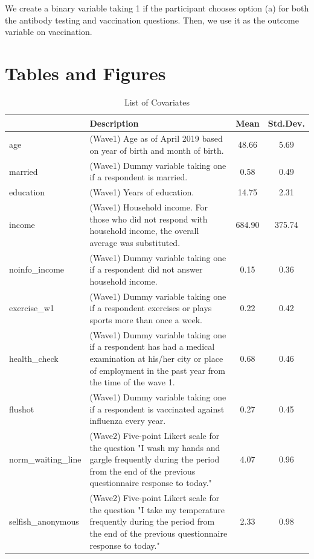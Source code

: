 \documentclass[
]{article}
\begin{document}
We create a binary variable taking 1 if the participant chooses option (a) for both the antibody testing and vaccination questions. Then, we use it as the outcome variable on vaccination.

\clearpage

\hypertarget{fig-tab}{%
\section{Tables and Figures}\label{fig-tab}}

\begin{table}[!h]

\caption{\label{tab:covariate-list}List of Covariates}
\centering
\fontsize{9}{11}\selectfont
\begin{tabular}[t]{l>{\raggedright\arraybackslash}p{30em}cc}
\toprule
  & Description & Mean & Std.Dev.\\
\midrule
age & (Wave1) Age as of April 2019 based on year of birth and month of birth. & \num{48.66} & \num{5.69}\\
married & (Wave1) Dummy variable taking one if a respondent is married. & \num{0.58} & \num{0.49}\\
education & (Wave1) Years of education. & \num{14.75} & \num{2.31}\\
income & (Wave1) Household income. For those who did not respond with household income, the overall average was substituted. & \num{684.90} & \num{375.74}\\
noinfo\_income & (Wave1) Dummy variable taking one if a respondent did not answer household income. & \num{0.15} & \num{0.36}\\
exercise\_w1 & (Wave1) Dummy variable taking one if a respondent exercises or plays sports more than once a week. & \num{0.22} & \num{0.42}\\
health\_check & (Wave1) Dummy variable taking one if a respondent has had a medical examination at his/her city or place of employment in the past year from the time of the wave 1. & \num{0.68} & \num{0.46}\\
flushot & (Wave1) Dummy variable taking one if a respondent is vaccinated against influenza every year. & \num{0.27} & \num{0.45}\\
norm\_waiting\_line & (Wave2) Five-point Likert scale for the question "I wash my hands and gargle frequently during the period from the end of the previous questionnaire response to today." & \num{4.07} & \num{0.96}\\
selfish\_anonymous & (Wave2) Five-point Likert scale for the question "I take my temperature frequently during the period from the end of the previous questionnaire response to today." & \num{2.33} & \num{0.98}\\

\end{tabular}
\end{table}
\end{document}
